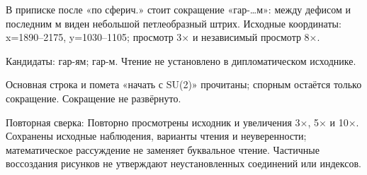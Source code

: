 В приписке после «по сферич.» стоит сокращение «гар-…м»: между дефисом и последним м виден небольшой петлеобразный штрих. Исходные координаты: x=1890–2175, y=1030–1105; просмотр 3× и независимый просмотр 8×.\par
Кандидаты: гар-ям; гар-м. Чтение не установлено в дипломатическом исходнике.\par
Основная строка и помета «начать с SU(2)» прочитаны; спорным остаётся только сокращение. Сокращение не развёрнуто.\par
Повторная сверка: Повторно просмотрены исходник и увеличения 3×, 5× и 10×. Сохранены исходные наблюдения, варианты чтения и неуверенности; математическое рассуждение не заменяет буквальное чтение. Частичные воссоздания рисунков не утверждают неустановленных соединений или индексов.\par\medskip
